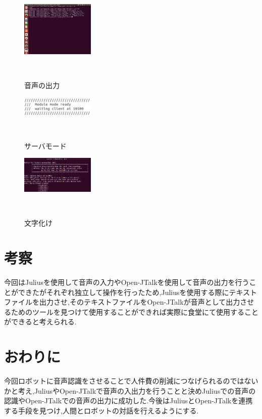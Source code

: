 \documentclass[11pt]{si2016}
\begin{document}
\begin{figure}[h]
 \begin{center}
  \includegraphics[width=35mm]{img/konpairu.png}
 　\caption{音声の出力}
 　\label{fig:konpairu}
 \end{center}
\end{figure}


\begin{figure}[h]
 \begin{center}
  \includegraphics[width=35mm]{img/sa-ba1.png}
 　\caption{サーバモード}
 　\label{fig:sa-ba-1}
 \end{center}
\end{figure}


\begin{figure}[h]
 \begin{center}
  \includegraphics[width=35mm]{img/moji.png}
 　\caption{文字化け}
 　\label{fig:moji}
 \end{center}
\end{figure}


\section{考察}
今回はJuliusを使用して音声の入力やOpen-JTalkを使用して音声の出力を行うことができたがそれぞれ独立して操作を行ったため,Juliusを使用する際にテキストファイルを出力させ,そのテキストファイルをOpen-JTalkが音声として出力させるためのツールを見つけて使用することができれば実際に食堂にて使用することができると考えられる.


\section{おわりに}
今回ロボットに音声認識をさせることで人件費の削減につなげられるのではないかと考え,JuliusやOpen-JTalkで音声の入出力を行うことと決めJuliusでの音声の認識やOpen-JTalkでの音声の出力に成功した.今後はJuliusとOpen-JTalkを連携する手段を見つけ,人間とロボットの対話を行えるようにする.
\end{document}
